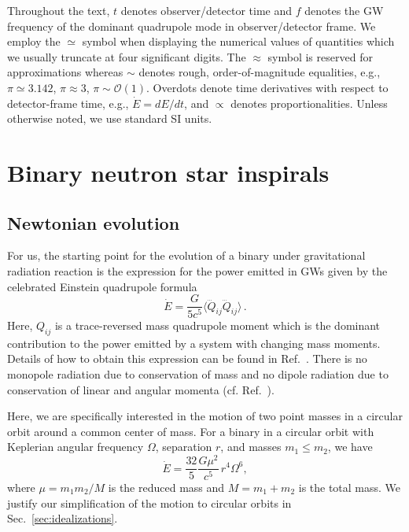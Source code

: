 \documentclass[prd,amsmath,amssymb,aps,floats,amsfonts,notitlepage,superscriptaddress,eqsecnum,nofootinbib,10pt]{revtex4-1}
\newcommand{\ord}{\mathcal{O}}
\newcommand{\f}{\frac}
\newcommand{\be}{\begin{equation}}
\newcommand{\ee}{\end{equation}}
\begin{document}
Throughout the text, $t$ denotes observer/detector time and $f$ denotes the GW frequency of the dominant quadrupole mode in observer/detector frame. 
We employ the $\simeq$ symbol when displaying the numerical values of quantities %
which we usually truncate at four significant digits.
The $\approx$ symbol is reserved for approximations whereas $\sim$ denotes rough, order-of-magnitude equalities,
e.g., $\pi \simeq 3.142$, $\pi \approx 3$, $\pi \sim \ord(1)$. %
Overdots denote time derivatives with respect to detector-frame time, e.g., $\dot{E} =dE/dt$, and $\propto$ denotes proportionalities. 
Unless otherwise noted, we use standard SI units.

\section{Binary neutron star inspirals}\label{sec:BNS_inspiral}
\subsection{Newtonian evolution}
For us, the starting point for the evolution of a binary under gravitational radiation reaction
is the expression for the power emitted in GWs given by 
the celebrated Einstein quadrupole formula \cite{1918SPAW}
%
\be
\dot{E} = \f{G}{5c^5}\langle \dddot{Q}_{ij}\dddot{Q}_{ij} \rangle \label{eq:Edot_quadrupole}\, .
\ee
%
Here, $Q_{ij}$ is a trace-reversed mass quadrupole moment which
is the dominant contribution to the power emitted %
by a system with changing mass moments. Details of how to obtain this expression can be found in Ref.~\cite{Maggiore}.
There is no monopole radiation due to conservation of mass and no dipole radiation due to conservation of linear and angular momenta
(cf. Ref.~\cite{Mono}).

Here, we are specifically interested in the motion of two point masses in a circular orbit around a common center of mass.
For a binary in a circular orbit with Keplerian angular frequency $\Omega$, separation $r$, and masses $m_1 \le m_2$, we have \cite{Maggiore}
%
\be
\dot{E} = \f{32}{5}\f{G\mu^2}{c^5}\, r^4 \Omega^6\label{eq:Edot},
\ee
%
where $\mu= m_1 m_2/M$ is the reduced mass and $M=m_1+m_2$ is the total mass. 
We justify our simplification of the motion to circular orbits in Sec.~\ref{sec:idealizations}.
\end{document}
